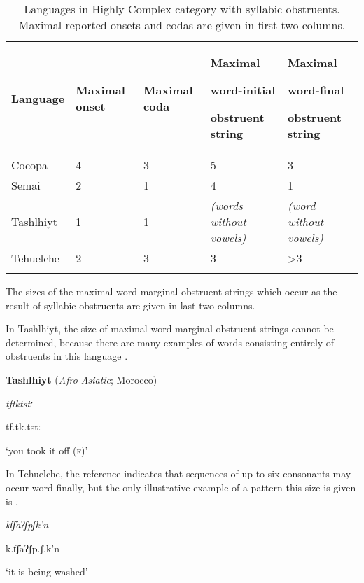 \begin{table}
\begin{tabularx}{\textwidth}{XXXXX}
\lsptoprule

\textbf{Language} & \textbf{Maximal} \textbf{onset} & \textbf{Maximal} \textbf{coda} & { \textbf{Maximal} }

{ \textbf{word-initial} }

 \textbf{obstruent} \textbf{string} & { \textbf{Maximal} }

{ \textbf{word-final} }

 \textbf{obstruent} \textbf{string}\\
Cocopa & 4 & 3 & 5 & 3\\
Semai & 2 & 1 & 4 & 1\\
Tashlhiyt & 1 & 1 & \textit{(words} \textit{without} \textit{vowels)} & \textit{(word} \textit{without} \textit{vowels)}\\
Tehuelche & 2 & 3 & 3 & >3\\
\lspbottomrule
\end{tabularx}
\caption{\label{3.1}Languages in Highly Complex category with syllabic obstruents. Maximal reported onsets and codas are given in first two columns.}The sizes of the maximal word-marginal obstruent strings which occur as the result of syllabic obstruents are given in last two columns.
\end{table}

  In Tashlhiyt, the size of maximal word-marginal obstruent strings cannot be determined, because there are many examples of words consisting entirely of obstruents in this language . 

\ea\label{ex:(3.12)}
  \textbf{Tashlhiyt} (\textit{Afro-Asiatic}; Morocco)

\textit{tftktstː}

tf.tk.tstː

\glt ‘you took it off (\textsc{f})’

\citep[332]{Ridouane2008}

\z

In Tehuelche, the reference indicates that sequences of up to six consonants may occur word-finally, but the only illustrative example of a pattern this size is given is .

\ea\label{ex:(3.13)}

\textit{kt͡ʃaʔʃpʃk’n}

k.t͡ʃaʔʃp.ʃ.k’n

\glt ‘it is being washed’

